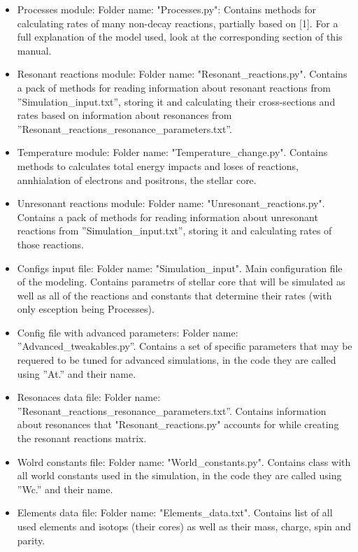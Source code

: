 \documentclass[a4paper,12pt]{article}
\begin{document}
\begin{itemize}
\item Processes module: Folder name: "Processes.py": Contains methods for calculating rates of many non-decay reactions, partially based on [1]. For a full explanation of the model used, look at the corresponding section of this manual.

\item Resonant reactions module: Folder name: "Resonant\_reactions.py". Contains a pack of methods for reading information about resonant reactions from ''Simulation\_input.txt'', storing it and calculating their cross-sections and rates based on information about resonances from ''Resonant\_reactions\_resonance\_parameters.txt''.

\item Temperature module: Folder name: "Temperature\_change.py". Contains methods to calculates total energy impacts and loses of reactions, annhialation of electrons and positrons,  the stellar core.

\item Unresonant reactions module: Folder name: "Unresonant\_reactions.py". Contains a pack of methods for reading information about unresonant reactions from ''Simulation\_input.txt'', storing it  and calculating rates of those reactions.

\item Configs input file: Folder name: "Simulation\_input". Main configuration file of the modeling. Contains parametrs of stellar core that will be simulated as well as all of the reactions and constants that determine their rates (with only esception being Processes).

\item Config file with advanced parameters: Folder name: ''Advanced\_tweakables.py''. Contains a set of specific parameters that may be requered to be tuned for advanced simulations, in the code they are called using ''At.'' and their name.

\item Resonaces data file: Folder name: ''Resonant\_reactions\_resonance\_parameters.txt''. Contains information about resonances that "Resonant\_reactions.py" accounts for while creating the resonant reactions matrix.

\item Wolrd constants file: Folder name: "World\_constants.py". Contains class with all world constants used in the simulation, in the code they are called using ''Wc.'' and their name.

\item Elements data file: Folder name: "Elements\_data.txt". Contains list of all used elements and isotops (their cores) as well as their mass, charge, spin and parity.


\end{itemize}
\end{document}
